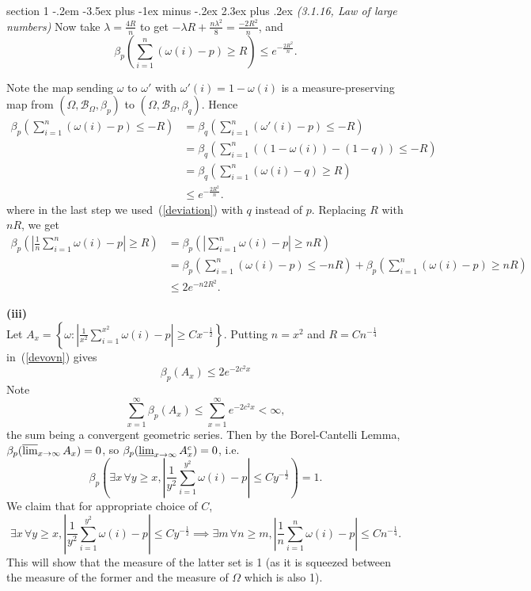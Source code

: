 \documentclass[12pt]{article}
\makeatletter
\theoremstyle{norm}
\providecommand{\cal}[1]{\mathcal{#1}}
\renewcommand{\cal}[1]{\mathcal{#1}}
\newcommand{\rc}[1]{\frac{1}{#1}}
\newcommand{\be}[0]{\beta}
\newcommand{\la}[0]{\lambda}
\newcommand{\om}[0]{\omega}
\newcommand{\Om}[0]{\Omega}
\newcommand{\ab}[1]{\left| {#1} \right|}
\newcommand{\bc}[1]{\left\{ {#1} \right\}}
\newcommand{\pa}[1]{\left( {#1} \right)}
\newcommand{\subprob}[1]{\noindent\textbf{#1}\\}
\newcommand{\iy}[0]{\infty}
\newenvironment{problem}{\@startsection
       {section}
       {1}
       {-.2em}
       {-3.5ex plus -1ex minus -.2ex}
       {2.3ex plus .2ex}
       {\pagebreak[3]%
       \large\bf\noindent{Problem }
       }
       }
       {%
       }
\makeatother
\begin{document}
\begin{problem}{\it(3.1.16, Law of large numbers)}
Now take $\la=\frac{4R}{n}$ to get $-\la R+\frac{n\la^2}{8}=\frac{-2R^2}{n}$, and
\begin{equation}\label{deviation}
\be_p\pa{
\sum_{i=1}^n (\om(i)-p)\ge R
}\le e^{-\frac{2R^2}{n}}.
\end{equation}

Note the map sending $\om$ to $\om'$ with $\om'(i)=1-\om(i)$ is a measure-preserving map from 
$(\Om, \cal B_{\Om}, \be_p)$ to $(\Om, \cal B_{\Om}, \be_q)$. Hence
\begin{align*}
\be_p\pa{\sum_{i=1}^n (\om(i)-p)\le -R}&=
\be_q\pa{\sum_{i=1}^n (\om'(i)-p)\le -R}\\
&=\be_q\pa{\sum_{i=1}^n((1-\om(i))-(1-q))\le -R}\\
&=\be_q\pa{\sum_{i=1}^n(\om(i)-q)\ge R}\\
&\le e^{-\frac{2R^2}{n}}.
\end{align*}
where in the last step we used~(\ref{deviation}) with $q$ instead of $p$.
Replacing $R$ with $nR$, we get
\begin{align}
\nonumber
\be_p\pa{
\ab{\rc n
\sum_{i=1}^n \om(i)-p
}\ge R
}
&=
\be_p\pa{
\ab{
\sum_{i=1}^n \om(i)-p
}\ge nR
}\\
\nonumber&= \be_p\pa{
\sum_{i=1}^n (\om(i)-p)\le -nR
}+\be_p\pa{\sum_{i=1}^n (\om(i)-p)\ge nR}\\
\label{devovn}&\le 2e^{-n2R^2}.
\end{align}

\subprob{(iii)}
Let $A_x=\bc{\om:
\ab{\rc{x^2}\sum_{i=1}^{x^2} \om(i)-p}\ge Cx^{-\rc 2}
}$.
Putting $n=x^2$ and $R=Cn^{-\rc 4}$ in~(\ref{devovn}) gives
\[
\be_p(A_x)\le 2e^{-2c^2x}
\]
Note
\[
\sum_{x=1}^{\iy} \be_p(A_x)\le \sum_{x=1}^{\iy}e^{-2c^2x}<\iy,
\] 
the sum being a convergent geometric series. Then by the Borel-Cantelli Lemma, $\be_p(\varlimsup_{x\to \iy} A_x)=0$, so $\be_p(\varliminf_{x\to \iy} A_x^c)=0$, i.e. 
\begin{equation}\label{p3-5-1}
\be_p\pa{
\exists x\,\forall y\ge x,\ab{\rc{y^2}\sum_{i=1}^{y^2}\om(i)-p}\le Cy^{-\rc{2}}
}=1.
\end{equation}
We claim that for appropriate choice of $C$,
\begin{equation}\label{p3-5-2}
\exists x\,\forall y\ge x,\ab{\rc{y^2}\sum_{i=1}^{y^2}\om(i)-p}\le Cy^{-\rc{2}}\implies 
\exists m\,\forall n\ge m,\ab{\rc{n}\sum_{i=1}^n\om(i)-p}\le Cn^{-\rc{4}}.
\end{equation}
This will show that the measure of the latter set is 1 (as it is squeezed between the measure of the former and the measure of $\Om$ which is also 1).


\end{problem}
\end{document}
